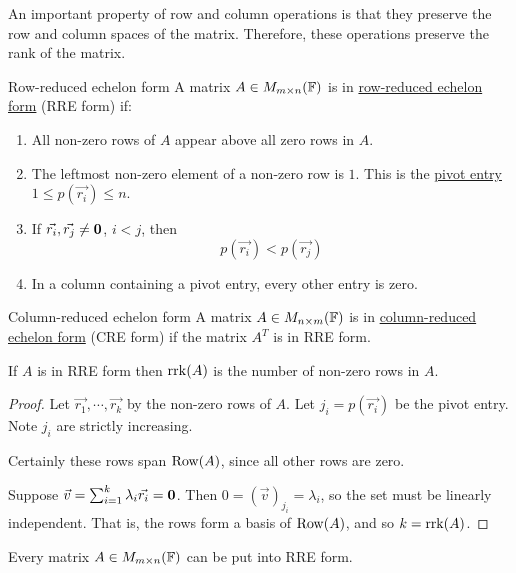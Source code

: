 \documentclass[../Main.tex]{subfiles}
\begin{document}
An important property of row and column operations is that they preserve the row and column spaces of the matrix. Therefore, these operations preserve the rank of the matrix.
\begin{definition}{Row-reduced echelon form}
    A matrix $A \in M_{m \times n}(\mathbb{F})$ is in \underline{row-reduced echelon form} (RRE form) if:
    \begin{enumerate}
        \item All non-zero rows of $A$ appear above all zero rows in $A$.
        \item The leftmost non-zero element of a non-zero row is $1$. This is the \underline{pivot entry} $1 \leq p(\vec{r_i}) \leq n$.
        \item If $\vec{r_i}, \vec{r_j} \neq \boldsymbol{0}$, $i < j$, then
            \begin{equation*}
                p(\vec{r_i}) < p(\vec{r_j})
            \end{equation*} 
        \item In a column containing a pivot entry, every other entry is zero.
    \end{enumerate}
\end{definition}
\begin{definition}{Column-reduced echelon form}
    A matrix $A \in M_{n \times m}(\mathbb{F})$ is in \underline{column-reduced echelon form} (CRE form) if the matrix $A^T$ is in RRE form.
\end{definition}
\begin{lemma}
    If $A$ is in RRE form then $\operatorname{rrk}(A)$ is the number of non-zero rows in $A$.
    \label{lemRRECrk}
\end{lemma}
\begin{proof}
    Let $\vec{r_1}, \cdots, \vec{r_k}$ by the non-zero rows of $A$. Let $j_i = p(\vec{r_i})$ be the pivot entry. Note $j_i$ are strictly increasing.

    Certainly these rows span $\operatorname{Row}(A)$, since all other rows are zero.

    Suppose $\vec{v} = \sum_{i=1}^{k} \lambda_i \vec{r_i} = \boldsymbol{0}$. Then $0 = (\vec{v})_{j_i} = \lambda_i$, so the set must be linearly independent. That is, the rows form a basis of $\operatorname{Row}(A)$, and so $k = \operatorname{rrk}(A)$.
\end{proof}
\begin{theorem}
    Every matrix $A \in M_{m \times n}(\mathbb{F})$ can be put into RRE form.
    \label{thmRREFormation}
\end{theorem}
\end{document}
